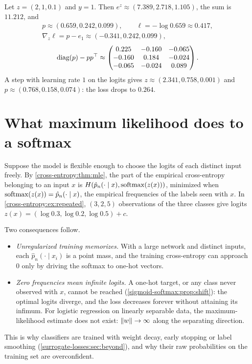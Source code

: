 \begin{notechapter}
\begin{example}\label{sigmoid-softmax:ex:step}
Let $z = (2, 1, 0.1)$ and $y = 1$. Then $e^z\approx(7.389, 2.718, 1.105)$, the sum is $11.212$, and
\begin{gather*}
  p\approx(0.659, 0.242, 0.099),\qquad
  \ell = -\log0.659\approx0.417,\\
  \nabla_z\ell = p - e_1\approx(-0.341, 0.242, 0.099),
\end{gather*}
\[
  \operatorname{diag}(p) - pp^\top\approx\begin{pmatrix}0.225&-0.160&-0.065\\-0.160&0.184&-0.024\\-0.065&-0.024&0.089\end{pmatrix}.
\]
A step with learning rate $1$ on the logits gives $z\approx(2.341, 0.758, 0.001)$ and
$p\approx(0.768, 0.158, 0.074)$: the loss drops to $0.264$.
\end{example}

\section{What maximum likelihood does to a softmax}\label{sigmoid-softmax:sec:frequencies}

Suppose the model is flexible enough to choose the logits of each distinct input
freely. By \cref{cross-entropy:thm:mle}, the part of the empirical cross-entropy
belonging to an input $x$ is $H(\hat p_n(\cdot\mid x), \operatorname{softmax}(z(x)))$, minimized when
$\operatorname{softmax}(z(x)) = \hat p_n(\cdot\mid x)$, the empirical frequencies of the labels seen with $x$.
In \cref{cross-entropy:ex:repeated}, $(3, 2, 5)$ observations of the three classes give
logits $z(x) = (\log0.3, \log0.2, \log0.5) + c$.

Two consequences follow.
\begin{itemize}[nosep]
  \item \emph{Unregularized training memorizes.} With a large network and distinct
        inputs, each $\hat p_n(\cdot\mid x_i)$ is a point mass, and the training cross-entropy can
        approach $0$ only by driving the softmax to one-hot vectors.
  \item \emph{Zero frequencies mean infinite logits.} A one-hot target, or any class never
        observed with $x$, cannot be reached (\cref{sigmoid-softmax:prop:shift}): the optimal logits
        diverge, and the loss decreases forever without attaining its infimum. For
        logistic regression on linearly separable data, the maximum-likelihood
        estimate does not exist: $\left\|w\right\|\to\infty$ along the separating direction.
\end{itemize}
This is why classifiers are trained with weight decay, early stopping or label
smoothing (\cref{surrogate-losses:sec:beyond}), and why their raw probabilities on the
training set are overconfident.


\end{notechapter}
